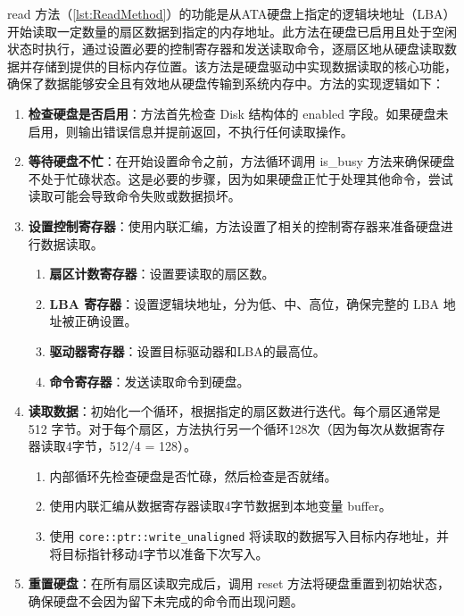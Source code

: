 read 方法（\cref{lst:ReadMethod}）的功能是从ATA硬盘上指定的逻辑块地址（LBA）开始读取一定数量的扇区数据到指定的内存地址。此方法在硬盘已启用且处于空闲状态时执行，通过设置必要的控制寄存器和发送读取命令，逐扇区地从硬盘读取数据并存储到提供的目标内存位置。该方法是硬盘驱动中实现数据读取的核心功能，确保了数据能够安全且有效地从硬盘传输到系统内存中。方法的实现逻辑如下：

\begin{enumerate}
    \item \textbf{检查硬盘是否启用}：方法首先检查 Disk 结构体的 enabled 字段。如果硬盘未启用，则输出错误信息并提前返回，不执行任何读取操作。
    \item \textbf{等待硬盘不忙}：在开始设置命令之前，方法循环调用 is\_busy 方法来确保硬盘不处于忙碌状态。这是必要的步骤，因为如果硬盘正忙于处理其他命令，尝试读取可能会导致命令失败或数据损坏。
    \item \textbf{设置控制寄存器}：使用内联汇编，方法设置了相关的控制寄存器来准备硬盘进行数据读取。
          \begin{enumerate}
              \item \textbf{扇区计数寄存器}：设置要读取的扇区数。
              \item \textbf{LBA 寄存器}：设置逻辑块地址，分为低、中、高位，确保完整的 LBA 地址被正确设置。
              \item \textbf{驱动器寄存器}：设置目标驱动器和LBA的最高位。
              \item \textbf{命令寄存器}：发送读取命令到硬盘。
          \end{enumerate}
    \item \textbf{读取数据}：初始化一个循环，根据指定的扇区数进行迭代。每个扇区通常是 512 字节。对于每个扇区，方法执行另一个循环128次（因为每次从数据寄存器读取4字节，512/4 = 128）。
          \begin{enumerate}
              \item 内部循环先检查硬盘是否忙碌，然后检查是否就绪。
              \item 使用内联汇编从数据寄存器读取4字节数据到本地变量 buffer。
              \item 使用 \texttt{core::ptr::write\_unaligned} 将读取的数据写入目标内存地址，并将目标指针移动4字节以准备下次写入。
          \end{enumerate}
    \item \textbf{重置硬盘}：在所有扇区读取完成后，调用 reset 方法将硬盘重置到初始状态，确保硬盘不会因为留下未完成的命令而出现问题。
\end{enumerate}

